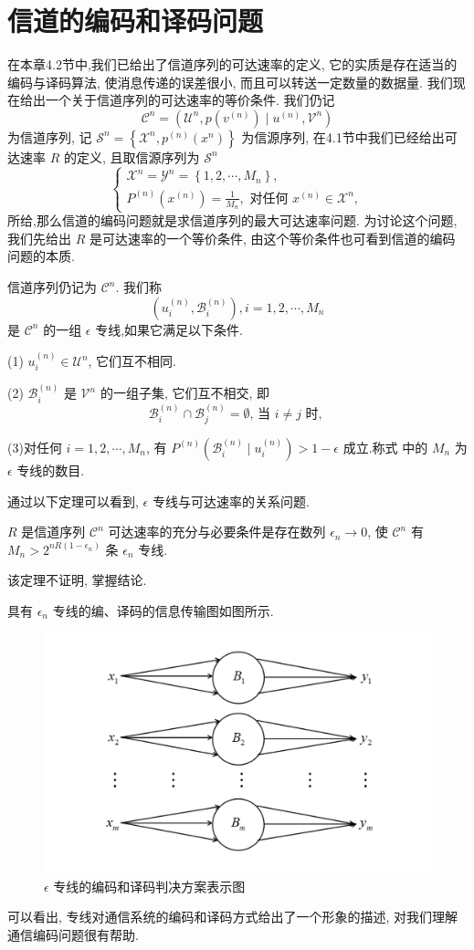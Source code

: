 \section{信道的编码和译码问题}
在本章4.2节中,我们已给出了信道序列的可达速率的定义, 它的实质是存在适当的编码与译码算法, 使消息传递的误差很小, 而且可以转送一定数量的数据量.
我们现在给出一个关于信道序列的可达速率的等价条件. 我们仍记
$$
\mathscr{C}^{n}=\left(\mathscr{U}^{n}, p\left(v^{(n)}\right) \mid u^{(n)}, \mathscr{V}^{n}\right)
$$
为信道序列, 记 $ \mathscr{S}^{n}=\left\{\mathscr{X}^{n}, p^{(n)}\left(x^{n}\right)\right\} $ 为信源序列, 在4.1节中我们已经给出可达速率 $ R $ 的定义, 且取信源序列为 $ \mathscr{S}^{n} $
$$
\left\{\begin{array}{l}
\mathscr{X}^{n}=\mathscr{Y}^{n}=\left\{1,2, \cdots, M_{n}\right\}, \\
P^{(n)}\left(x^{(n)}\right)=\frac{1}{M_{n}}, \text { 对任何 } x^{(n)} \in \mathscr{X}^{n},
\end{array}\right.
$$
所给,那么信道的编码问题就是求信道序列的最大可达速率问题. 为讨论这个问题, 我们先给出 $ R $ 是可达速率的一个等价条件, 由这个等价条件也可看到信道的编码问题的本质.

\begin{definition}
    信道序列仍记为 $ \mathscr{C}^{n} $. 我们称
$$
\left(u_{i}^{(n)}, \mathscr{B}_{i}^{(n)}\right), i=1,2, \cdots, M_{n}
$$
是 $ \mathscr{C}^{n} $ 的一组 $ \epsilon $ 专线,如果它满足以下条件.

(1) $ u_{i}^{(n)} \in \mathscr{U}^{n} $, 它们互不相同.

(2) $ \mathscr{B}_{i}^{(n)} $ 是 $ \mathscr{V}^{n} $ 的一组子集, 它们互不相交, 即
$$
\mathscr{B}_{i}^{(n)} \cap \mathscr{B}_{j}^{(n)}=\emptyset \text {, 当 } i \neq j \text { 时, }
$$

(3)对任何 $ i=1,2, \cdots, M_{n} $, 有 $ P^{(n)}\left(\mathscr{B}_{i}^{(n)} \mid u_{i}^{(n)}\right)>1-\epsilon $ 成立.称式 中的 $ M_{n} $ 为 $ \epsilon $ 专线的数目.
\end{definition}

通过以下定理可以看到, $ \epsilon $ 专线与可达速率的关系问题.
\begin{theorem}
    $ R $ 是信道序列 $ \mathscr{C}^{n} $ 可达速率的充分与必要条件是存在数列 $ \epsilon_{n} \rightarrow 0 $, 使 $ \mathscr{C}^{n} $ 有 $ M_{n}>2^{n R\left(1-\epsilon_{n}\right)} $ 条 $ \epsilon_{n} $ 专线.
\end{theorem}
该定理不证明, 掌握结论.

具有 $ \epsilon_{n} $ 专线的编、译码的信息传输图如图所示.

\begin{figure}[h]
    \centering
    \includegraphics[width=0.5\linewidth]{image/7.png}
    \caption{$ \epsilon $ 专线的编码和译码判决方案表示图}
\end{figure}
可以看出, 专线对通信系统的编码和译码方式给出了一个形象的描述, 对我们理解通信编码问题很有帮助.


